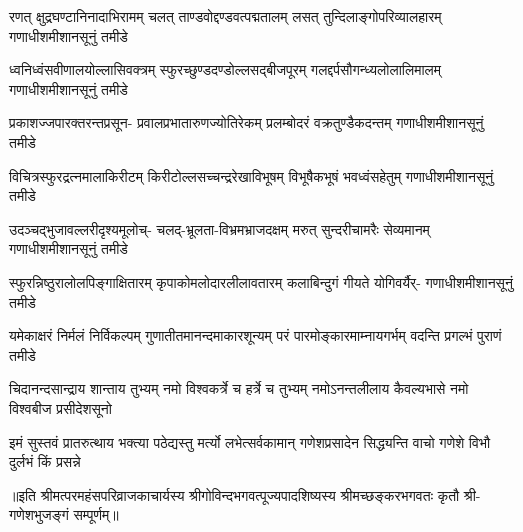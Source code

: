 

\fourlineindentedshloka
{रणत् क्षुद्रघण्टानिनादाभिरामम्}
{चलत् ताण्डवोद्दण्डवत्पद्मतालम्}
{लसत् तुन्दिलाङ्गोपरिव्यालहारम्}
{गणाधीशमीशानसूनुं तमीडे}%

\fourlineindentedshloka
{ध्वनिध्वंसवीणालयोल्लासिवक्त्रम्}
{स्फुरच्छुण्डदण्डोल्लसद्‌बीजपूरम्}
{गलद्दर्पसौगन्ध्यलोलालिमालम्}
{गणाधीशमीशानसूनुं तमीडे}%

\fourlineindentedshloka
{प्रकाशज्जपारक्तरन्तप्रसून-}
{प्रवालप्रभातारुणज्योतिरेकम्}
{प्रलम्बोदरं वक्रतुण्डैकदन्तम्}
{गणाधीशमीशानसूनुं तमीडे}%

\fourlineindentedshloka
{विचित्रस्फुरद्रत्नमालाकिरीटम्}
{किरीटोल्लसच्चन्द्ररेखाविभूषम्}
{विभूषैकभूषं भवध्वंसहेतुम्}
{गणाधीशमीशानसूनुं तमीडे}%

\fourlineindentedshloka
{उदञ्चद्भुजावल्लरीदृश्यमूलोच्-}
{चलद्‌-भ्रूलता-विभ्रमभ्राजदक्षम्}
{मरुत् सुन्दरीचामरैः सेव्यमानम्}
{गणाधीशमीशानसूनुं तमीडे}%

\fourlineindentedshloka
{स्फुरन्निष्ठुरालोलपिङ्गाक्षितारम्}
{कृपाकोमलोदारलीलावतारम्}
{कलाबिन्दुगं गीयते योगिवर्यैर्-}
{गणाधीशमीशानसूनुं तमीडे}%

\fourlineindentedshloka
{यमेकाक्षरं निर्मलं निर्विकल्पम्}
{गुणातीतमानन्दमाकारशून्यम्}
{परं पारमोङ्कारमाम्नायगर्भम्}
{वदन्ति प्रगल्भं पुराणं तमीडे}%

\fourlineindentedshloka
{चिदानन्दसान्द्राय शान्ताय तुभ्यम्}
{नमो विश्वकर्त्रे च हर्त्रे च तुभ्यम्}
{नमोऽनन्तलीलाय कैवल्यभासे}
{नमो विश्वबीज प्रसीदेशसूनो}%

\fourlineindentedshloka
{इमं सुस्तवं प्रातरुत्थाय भक्त्या}
{पठेद्यस्तु मर्त्यो लभेत्सर्वकामान्}
{गणेशप्रसादेन सिद्ध्यन्ति वाचो}
{गणेशे विभौ दुर्लभं किं प्रसन्ने}%

॥इति श्रीमत्परमहंसपरिव्राजकाचार्यस्य श्रीगोविन्दभगवत्पूज्यपादशिष्यस्य 
श्रीमच्छङ्करभगवतः कृतौ श्री-गणेशभुजङ्गं सम्पूर्णम्॥
